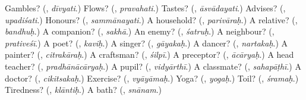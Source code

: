 \begin{tcolorbox}[breakable,colback=teal!4,colframe=teal!35!black,title={Before you move on}]
Gambles? (\textbf{}, \emph{dīvyati}.) Flows? (\textbf{}, \emph{pravahati}.) Tastes? (\textbf{}, \emph{āsvādayati}.) Advises? (\textbf{}, \emph{upadiśati}.) Honours? (\textbf{}, \emph{sammānayati}.) A household? (\textbf{}, \emph{parivāraḥ}.) A relative? (\textbf{}, \emph{bandhuḥ}.) A companion? (\textbf{}, \emph{sakhā}.) An enemy? (\textbf{}, \emph{śatruḥ}.) A neighbour? (\textbf{}, \emph{prativeśī}.) A poet? (\textbf{}, \emph{kaviḥ}.) A singer? (\textbf{}, \emph{gāyakaḥ}.) A dancer? (\textbf{}, \emph{nartakaḥ}.) A painter? (\textbf{}, \emph{citrakāraḥ}.) A craftsman? (\textbf{}, \emph{śilpī}.) A preceptor? (\textbf{}, \emph{ācāryaḥ}.) A head teacher? (\textbf{}, \emph{pradhānācāryaḥ}.) A pupil? (\textbf{}, \emph{vidyārthī}.) A classmate? (\textbf{}, \emph{sahapāṭhī}.) A doctor? (\textbf{}, \emph{cikitsakaḥ}.) Exercise? (\textbf{}, \emph{vyāyāmaḥ}.) Yoga? (\textbf{}, \emph{yogaḥ}.) Toil? (\textbf{}, \emph{śramaḥ}.) Tiredness? (\textbf{}, \emph{klāntiḥ}.) A bath? (\textbf{}, \emph{snānam}.)
\end{tcolorbox}
